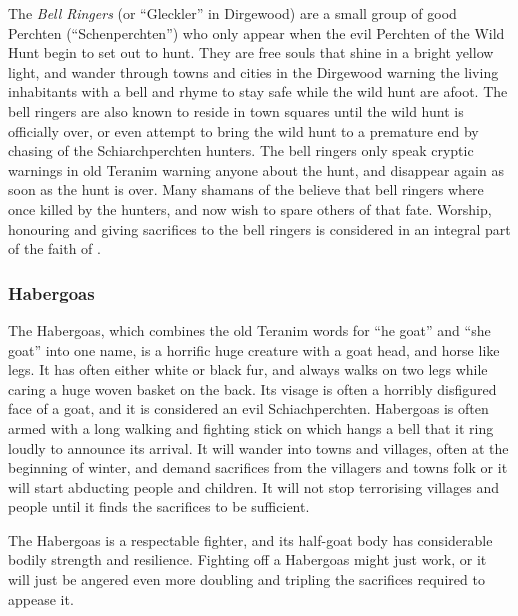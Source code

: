 The \emph{Bell Ringers} (or ``Gleckler'' in Dirgewood) are a small group of
good Perchten (``Schenperchten'') who only appear when the evil Perchten
of the Wild Hunt begin to set out to hunt. They are free souls that shine
in a bright yellow light, and wander through towns and cities in the Dirgewood
warning the living inhabitants with a bell and rhyme to stay safe while
the wild hunt are afoot. The bell ringers are also known to reside in town
squares until the wild hunt is officially over, or even attempt to bring the
wild hunt to a premature end by chasing of the Schiarchperchten hunters. The
bell ringers only speak cryptic warnings in old Teranim warning anyone about
the hunt, and disappear again as soon as the hunt is over. Many shamans of the
 believe that bell ringers where once killed by the
hunters, and now wish to spare others of that fate.  Worship, honouring and
giving sacrifices to the bell ringers is considered in an integral part of the
faith of .

\subsubsection{Habergoas}
\label{sec:Habergeiss}


The Habergoas, which combines the old Teranim words for ``he goat'' and ``she
goat'' into one name, is a horrific huge creature with a goat head, and horse
like legs. It has often either white or black fur, and always walks on two
legs while caring a huge woven basket on the back. Its visage is often a
horribly disfigured face of a goat, and it is considered an evil
Schiachperchten. Habergoas is often armed with a long walking and fighting
stick on which hangs a bell that it ring loudly to announce its arrival. It
will wander into towns and villages, often at the beginning of winter, and
demand sacrifices from the villagers and towns folk or it will start abducting
people and children. It will not stop terrorising villages and people until it
finds the sacrifices to be sufficient.

The Habergoas is a respectable fighter, and its half-goat body has
considerable bodily strength and resilience. Fighting off a Habergoas might
just work, or it will just be angered even more doubling and tripling the
sacrifices required to appease it.
